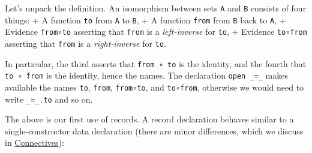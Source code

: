 Let's unpack the definition. An isomorphism between sets \texttt{A} and
\texttt{B} consists of four things: + A function \texttt{to} from
\texttt{A} to \texttt{B}, + A function \texttt{from} from \texttt{B}
back to \texttt{A}, + Evidence \texttt{from∘to} asserting that
\texttt{from} is a \emph{left-inverse} for \texttt{to}, + Evidence
\texttt{to∘from} asserting that \texttt{from} is a \emph{right-inverse}
for \texttt{to}.

In particular, the third asserts that \texttt{from\ ∘\ to} is the
identity, and the fourth that \texttt{to\ ∘\ from} is the identity,
hence the names. The declaration \texttt{open\ \_≃\_} makes available
the names \texttt{to}, \texttt{from}, \texttt{from∘to}, and
\texttt{to∘from}, otherwise we would need to write \texttt{\_≃\_.to} and
so on.

The above is our first use of records. A record declaration behaves
similar to a single-constructor data declaration (there are minor
differences, which we discuss in
\protect\hyperlink{Connectives}{Connectives}):

